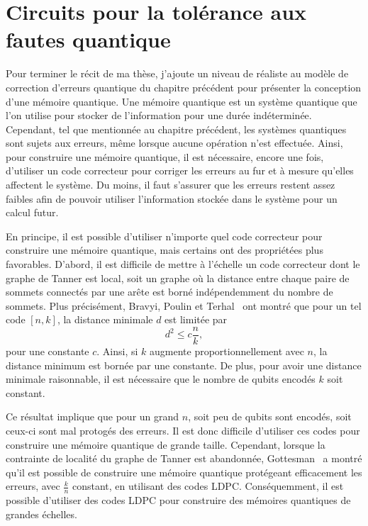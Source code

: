 \begin{comment}
\end{comment}

\chapter{Circuits pour la tolérance aux fautes quantique}

Pour terminer le récit de ma thèse,
j'ajoute un niveau de réaliste au modèle de correction d'erreurs quantique
du chapitre précédent pour présenter la conception d'une mémoire quantique.
Une mémoire quantique est un système quantique que l'on utilise pour stocker
de l'information pour une durée indéterminée.
Cependant,
tel que mentionnée au chapitre précédent,
les systèmes quantiques sont sujets aux erreurs,
même lorsque aucune opération n'est effectuée.
Ainsi,
pour construire une mémoire quantique,
il est nécessaire, encore une fois,
d'utiliser un code correcteur pour corriger les erreurs au fur et à mesure
qu'elles affectent le système.
Du moins,
il faut s'assurer que les erreurs restent assez faibles afin de pouvoir utiliser
l'information stockée dans le système pour un calcul futur.

En principe,
il est possible d'utiliser n'importe quel code correcteur pour construire
une mémoire quantique,
mais certains ont des propriétées plus favorables.
D'abord,
il est difficile de mettre à l'échelle un code correcteur dont le graphe
de Tanner est local, soit un graphe où la distance entre chaque paire de sommets 
connectés par une arête est borné indépendemment du nombre de sommets.
Plus précisément,
Bravyi, Poulin et Terhal~\cite{bravyi_tradeoffs_2010}
ont montré que pour un tel code $[n, k]$,
la distance minimale $d$ est limitée par
\begin{equation}
	d^2 \leq c \frac{n}{k},
\end{equation}
pour une constante $c$.
Ainsi,
si $k$ augmente proportionnellement avec $n$,
la distance minimum est bornée par une constante.
De plus,
pour avoir une distance minimale raisonnable,
il est nécessaire que le nombre de qubits encodés $k$ 
soit constant.

Ce résultat implique que pour un grand $n$,
soit peu de qubits sont encodés,
soit ceux-ci sont mal protogés des erreurs.
Il est donc difficile d'utiliser ces codes pour construire une mémoire 
quantique de grande taille.
Cependant,
lorsque la contrainte de localité du graphe de Tanner est abandonnée,
Gottesman~\cite{gottesman_fault-tolerant_2013} a montré qu'il est possible 
de construire une mémoire quantique protégeant efficacement les erreurs,
avec $\frac{k}{n}$ constant, en utilisant des codes LDPC.
Conséquemment,
il est possible d'utiliser des codes LDPC pour construire 
des mémoires quantiques de grandes échelles.

